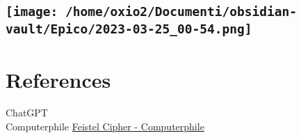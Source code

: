 \documentclass[
]{article}
\begin{document}
\hypertarget{png}{%
\subsection{\texorpdfstring{\protect\texttt{[image: /home/oxio2/Documenti/obsidian-vault/Epico/2023-03-25\_00-54.png]}}{2023-03-25\_00-54.png}}\label{png}}

\hypertarget{references-14}{%
\section{References}\label{references-14}}

ChatGPT\\
Computerphile \href{https://www.youtube.com/watch?v=FGhj3CGxl8I}{Feistel
Cipher - Computerphile}
\end{document}
